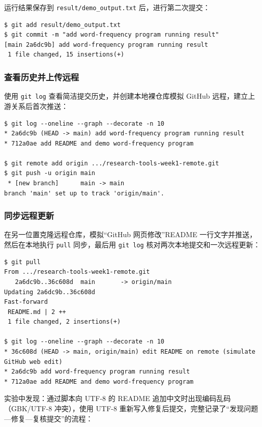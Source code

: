 \documentclass{SYSUReport}
\begin{document}
运行结果保存到 \texttt{result/demo\_output.txt} 后，进行第二次提交：

\begin{lstlisting}[caption={第二次提交：补充运行结果}]
$ git add result/demo_output.txt
$ git commit -m "add word-frequency program running result"
[main 2a6dc9b] add word-frequency program running result
 1 file changed, 15 insertions(+)
\end{lstlisting}

\subsubsection{查看历史并上传远程}

使用 \texttt{git log} 查看简洁提交历史，并创建本地裸仓库模拟 GitHub 远程，建立上游关系后首次推送：

\begin{lstlisting}[caption={查看历史与首次推送}]
$ git log --oneline --graph --decorate -n 10
* 2a6dc9b (HEAD -> main) add word-frequency program running result
* 712a0ae add README and demo word-frequency program

$ git remote add origin .../research-tools-week1-remote.git
$ git push -u origin main
 * [new branch]      main -> main
branch 'main' set up to track 'origin/main'.
\end{lstlisting}

\subsubsection{同步远程更新}

在另一位置克隆远程仓库，模拟“GitHub 网页修改”README 一行文字并推送，然后在本地执行 \texttt{pull} 同步，最后用 \texttt{git log} 核对两次本地提交和一次远程更新：

\begin{lstlisting}[caption={模拟远程修改并 pull 同步}]
$ git pull
From .../research-tools-week1-remote.git
   2a6dc9b..36c608d  main       -> origin/main
Updating 2a6dc9b..36c608d
Fast-forward
 README.md | 2 ++
 1 file changed, 2 insertions(+)

$ git log --oneline --graph --decorate -n 10
* 36c608d (HEAD -> main, origin/main) edit README on remote (simulate GitHub web edit)
* 2a6dc9b add word-frequency program running result
* 712a0ae add README and demo word-frequency program
\end{lstlisting}

实验中发现：通过脚本向 UTF-8 的 README 追加中文时出现编码乱码（GBK/UTF-8 冲突），使用 UTF-8 重新写入修复后提交，完整记录了“发现问题—修复—复核提交”的流程：
\end{document}
